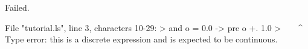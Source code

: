 \runverbatimfalse
{}
\begin{RunVerbatimMsg}
Failed.
\end{RunVerbatimMsg}
\begin{RunVerbatimErr}
File "tutorial.ls", line 3, characters 10-29:
>  and o = 0.0 -> pre o +. 1.0
>          ^^^^^^^^^^^^^^^^^^^
Type error: this is a discrete expression and is expected to be continuous.
\end{RunVerbatimErr}
